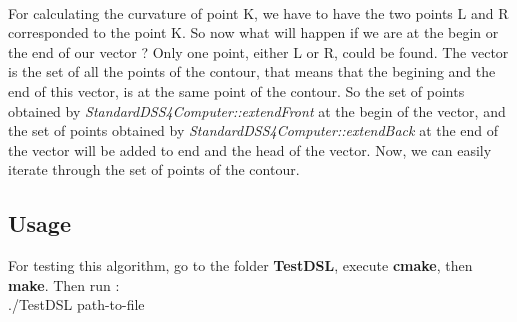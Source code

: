 \paragraph{}
For calculating the curvature of point K, we have to have the two points L and R corresponded to the point K. So now what will happen if we are at the begin or the end of our vector ? Only one point, either L or R, could be found. The vector is the set of all the points of the contour, that means that the begining and the end of this vector, is at the same point of the contour. So the set of points obtained by \textit{StandardDSS4Computer::extendFront} at the begin of the vector, and the set of points obtained by \textit{StandardDSS4Computer::extendBack} at the end of the vector will be added to end and the head of the vector. Now, we can easily iterate through the set of points of the contour.

\subsection{Usage}
For testing this algorithm, go to the folder \textbf{TestDSL}, execute \textbf{cmake}, then \textbf{make}. Then run :\\
./TestDSL path-to-file





